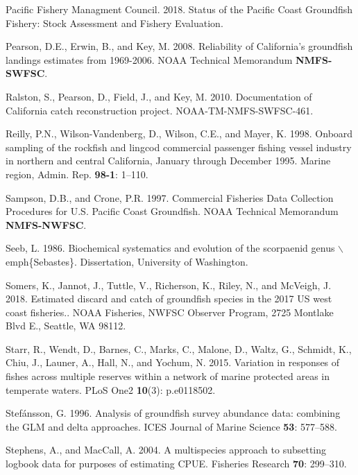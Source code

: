 \documentclass[12pt,]{article}
\begin{document}
\hypertarget{ref-PSMFC2018}{}
Pacific Fishery Managment Council. 2018. Status of the Pacific Coast
Groundfish Fishery: Stock Assessment and Fishery Evaluation.

\hypertarget{ref-Pearson2008}{}
Pearson, D.E., Erwin, B., and Key, M. 2008. Reliability of California's
groundfish landings estimates from 1969-2006. NOAA Technical Memorandum
\textbf{NMFS-SWFSC}.

\hypertarget{ref-Ralston2010}{}
Ralston, S., Pearson, D., Field, J., and Key, M. 2010. Documentation of
California catch reconstruction project. NOAA-TM-NMFS-SWFSC-461.

\hypertarget{ref-Reilly1998}{}
Reilly, P.N., Wilson-Vandenberg, D., Wilson, C.E., and Mayer, K. 1998.
Onboard sampling of the rockfish and lingcod commercial passenger
fishing vessel industry in northern and central California, January
through December 1995. Marine region, Admin. Rep. \textbf{98-1}: 1--110.

\hypertarget{ref-Sampson1997}{}
Sampson, D.B., and Crone, P.R. 1997. Commercial Fisheries Data
Collection Procedures for U.S. Pacific Coast Groundfish. NOAA Technical
Memorandum \textbf{NMFS-NWFSC}.

\hypertarget{ref-Seeb1986}{}
Seeb, L. 1986. Biochemical systematics and evolution of the scorpaenid
genus \(\backslash\)emph\{Sebastes\}. Dissertation, University of
Washington.

\hypertarget{ref-Somers2018}{}
Somers, K., Jannot, J., Tuttle, V., Richerson, K., Riley, N., and
McVeigh, J. 2018. Estimated discard and catch of groundfish species in
the 2017 US west coast fisheries.. NOAA Fisheries, NWFSC Observer
Program, 2725 Montlake Blvd E., Seattle, WA 98112.

\hypertarget{ref-Starr2015}{}
Starr, R., Wendt, D., Barnes, C., Marks, C., Malone, D., Waltz, G.,
Schmidt, K., Chiu, J., Launer, A., Hall, N., and Yochum, N. 2015.
Variation in responses of fishes across multiple reserves within a
network of marine protected areas in temperate waters. PLoS One2
\textbf{10}(3): p.e0118502.

\hypertarget{ref-Stefansson1996}{}
Stefánsson, G. 1996. Analysis of groundfish survey abundance data:
combining the GLM and delta approaches. ICES Journal of Marine Science
\textbf{53}: 577--588.

\hypertarget{ref-Stephens2004}{}
Stephens, A., and MacCall, A. 2004. A multispecies approach to
subsetting logbook data for purposes of estimating CPUE. Fisheries
Research \textbf{70}: 299--310.
\end{document}
